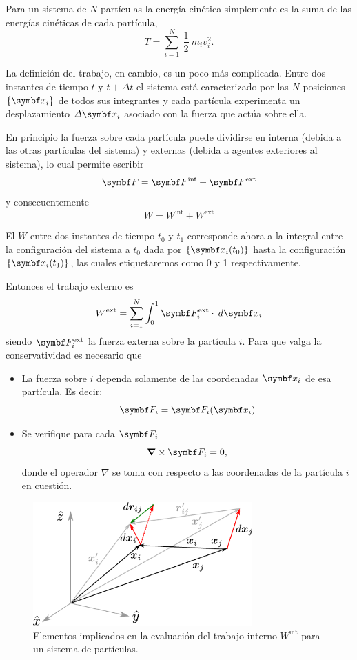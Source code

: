 \documentclass[10pt,oneside]{CBFT_book}
\begin{document}
Para un sistema de $ N $ partículas la energía cinética simplemente es la suma de las energías cinéticas de cada 
partícula,
\[
	T = \sum_{i=1}^N \: \frac{1}{2} \: m_i v_i^2.
\]

La definición del trabajo, en cambio, es un poco más complicada. Entre dos instantes de tiempo $ t $ y $ t + \Delta t $ 
el sistema está caracterizado por las $ N $ posiciones $ \{\vb{x}_i\} $ de todos sus integrantes y cada partícula 
experimenta un desplazamiento $ \Delta \vb{x}_i $ asociado con la fuerza que actúa sobre ella.

En principio la fuerza sobre cada partícula puede dividirse en interna (debida a las otras partículas del sistema) y 
externas (debida a agentes exteriores al sistema), lo cual permite escribir
\[
	\vb{F} = \vb{F}^{\text{int}} + \vb{F}^{\text{ext}}
\]
y consecuentemente
\[
	W = W^{\text{int}} + W^{\text{ext}}
\]

El $ W $ entre dos instantes de tiempo $t_0$ y $t_1$ corresponde ahora a la integral entre la configuración del sistema 
a $t_0$ dada por $ \{\vb{x}_i(t_0)\} $ hasta la configuración $ \{\vb{x}_i(t_1)\} $, las cuales etiquetaremos como 0 y 
1 respectivamente. 

Entonces el trabajo externo es
\[
	W^{\text{ext}} = \sum_{i=1}^N \int_0^1 \vb{F}^{\text{ext}}_i \cdot \: d\vb{x}_i
\]
siendo $ \vb{F}^{\text{ext}}_i $ la fuerza externa sobre la partícula $i$. Para que valga la conservatividad es 
necesario que 
\begin{itemize}
 \item La fuerza sobre $i$ dependa solamente de las coordenadas $\vb{x}_i$ de esa partícula. Es decir:
 \[
	\vb{F}_i = \vb{F}_i(\vb{x}_i)
 \]
 \item Se verifique para cada $\vb{F}_i$ 
 \[
	\Nabla \times \vb{F}_i = 0,
 \]
 donde el operador $\nabla$ se toma con respecto a las coordenadas de la partícula $i$ en cuestión.
\end{itemize}

\begin{figure}[!h]
	\begin{center}
	\includegraphics[width=0.75\textwidth]{images/fig_mc_work_system.pdf}	
	\end{center}
	\caption{Elementos implicados en la evaluación del trabajo interno $ W^{\text{int}} $ para un sistema
	de partículas.}
	\label{fig_mc_work_system}
\end{figure} 
\end{document}
